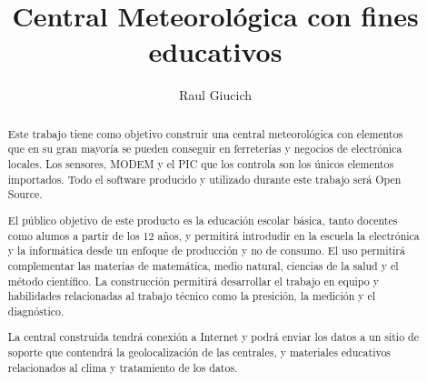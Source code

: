 \documentclass[11pt, spanish]{report}
\title{Central Meteorológica con fines educativos}
\author{Raul Giucich}
\begin{document}
\maketitle

\begin{abstract}

Este trabajo tiene como objetivo construir una central meteorológica con elementos que en su gran mayoría se pueden conseguir en ferreterías y negocios de electrónica locales. Los sensores, MODEM y el PIC que los controla son los únicos elementos importados. Todo el software producido y utilizado durante este trabajo será Open Source.

El público objetivo de este producto es la educación escolar básica, tanto docentes como alumos a partir de los 12 años, y permitirá introdudir en la escuela la electrónica y la informática desde un enfoque de producción y no de consumo. El uso permitirá complementar las materias de matemática, medio natural, ciencias de la salud y el método científico. La construcción permitirá desarrollar el trabajo en equipo y habilidades relacionadas al trabajo técnico como la presición, la medición y el diagnóstico.

La central construida tendrá conexión a Internet y podrá enviar los datos a un sitio de soporte que contendrá la geolocalización de las centrales, y materiales educativos relacionados al clima y tratamiento de los datos.


\end{abstract}
\end{document}
